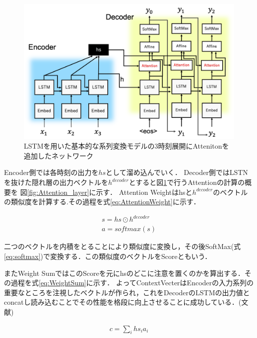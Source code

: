 \documentclass[a4j,11pt,report]{jsbook}
\begin{document}
\begin{center}
  \begin{figure}[h]
    \centering
    \includegraphics[width=\linewidth]{image/attention_image.png}
    \caption{LSTMを用いた基本的な系列変換モデルの3時刻展開にAttenitonを追加したネットワーク　}
    \label{fig:Attention_3time}
  \end{figure}
\end{center}



Encoder側では各時刻の出力を$hs$として溜め込んでいく．
Decoder側ではLSTNを抜けた隠れ層の出力ベクトルを$h^{decoder}$とすると図\ref{fig:Attention_3time}で行うAttentionの計算の概要を
図\ref{fig:Attention_layer}に示す．
Attention Weightはhsと$h^{decoder}$のベクトルの類似度を計算する.その過程を式\ref{eq:AttentionWeight}に示す．

\begin{equation}
  \label{eq:AttentionWeight}
  \begin{split}
    s = hs \odot h^{decoder}  \\
    a = softmax(s)
  \end{split}
\end{equation}

二つのベクトルを内積をとることにより類似度に変換し，その後SoftMax(式\ref{eq:softmax})で変換する．この類似度のベクトルをScoreともいう．

またWeight SumではこのScoreを元にhsのどこに注意を置くのかを算出する．その過程を式\ref{eq:WeightSum}に示す．
よってContextVecterはEncoderの入力系列の重要なところを注視したベクトルが作られ，これをDecoderのLSTMの出力値とconcatし読み込むことでその性能を格段に向上させることに成功している．(文献\cite{attention})


\begin{equation}
  \label{eq:WeightSum}
  \begin{split}
    c = \sum_{i} hs_{i} a_{i}
  \end{split}
\end{equation}
\end{document}
